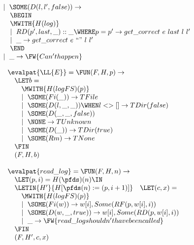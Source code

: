 \begin{figure*}
\begin{minipage}[t]{0.5\linewidth}
\begin{displaymath}
\begin{array}{l}
\quad \mid~\SOME(D(l,l',false)) \rightarrow \\
\qquad \BEGIN \\
\qquad \MWITH{H(log)} \\
\qquad \mid~RD(p',last,\_) :: \_ \WHERE p=p' \rightarrow get\_correct~e~last~l~l' \\
\qquad \mid~\_ \rightarrow get\_correct~e~``"~l~l' \\
\qquad \END \\
\quad \mid~\_ \rightarrow \FW{Can't happen} \\
\end{array}
\end{displaymath}
\end{minipage}
\hfill
\begin{minipage}[t]{0.5\linewidth}
\begin{displaymath}
\begin{array}{l}
\evalpat{\LL{E}} = \FUN (F,H,p) \rightarrow \\
\quad \LET b = \\
\qquad \MWITH{H(logFS)(p)} \\
\qquad \mid~\SOME(Fi(\_)) \rightarrow TFile\\
\qquad \mid~\SOME(D(l,\_,\_)) \WHEN l <> [] \rightarrow TDir(false) \\
\qquad \mid~\SOME(D(\_,\_,false))  \\
\qquad \mid~\NONE \rightarrow TUnknown \\
\qquad \mid~\SOME(D(\_)) \rightarrow TDir(true) \\
\qquad \mid~\SOME(Rm) \rightarrow TNone \\
\quad \FIN \\
\quad (F,H,b) \\
\\
\evalpat{read\_log} = \FUN (F,H,n) \rightarrow \\
\quad \LET (p,i) = H(\pfds)(n) \IN \\
\quad \LETIN{H'}{H[\pfds(n) := (p,i+1)]}
\quad \LET (c,x) = \\
\qquad \MWITH{H(logFS)(p)} \\
\qquad \mid~\SOME(Fi(w)) \rightarrow w[i],Some(RF(p,w[i],i))\\
\qquad \mid~\SOME(D(w,\_,true)) \rightarrow  w[i],Some(RD(p,w[i],i)) \\
\qquad \mid~\_ \rightarrow \FW{read\_log shouldn't have been called} \\
\quad \FIN \\
\quad (F,H',c,x) \\

\end{array}
\end{displaymath}
\end{minipage}
\end{figure*}
